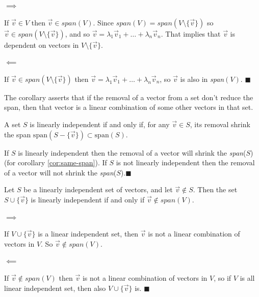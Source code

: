 \begin{tcolorbox}[colback=def_color,coltitle=black,coltext=black,colframe=pro_color_back,title=\textbf{Proof}] 

$\implies$

If $\vec v \in V$ then $\vec v \in \textit{span}(V)$. Since $\textit{span}(V) = \textit{span}(V \setminus \{\vec v\})$ so $\vec v \in \textit{span}(V \setminus \{\vec v\})$, and so $\vec v = \lambda_1 \vec v_1 + \dots + \lambda_n \vec v_n$. That implies that $\vec v$ is dependent on vectors in $V \setminus \{\vec v\}$.

$\impliedby$

If $\vec v \in \textit{span}(V \setminus \{\vec v\})$ then $\vec v = \lambda_1 \vec v_1 + \dots + \lambda_n \vec v_n$, so $\vec v$ is also in \textit{span}$(V)$.
$\blacksquare$
\end{tcolorbox}
The corollary asserts that if the removal of a vector from a set don't reduce the span, then that vector is a linear combination of some other vectors in that set.

\begin{tcolorbox}[colback=def_color,colframe=gray,coltext=black] \begin{corollary}
    A set $S$ is linearly independent if and only if, for any $\vec{v} \in S$, its removal shrink the span $\text{span}(S - \{\vec{v}\}) \subset \text{span}(S)$.
\end{corollary}
\end{tcolorbox}

\begin{tcolorbox}[colback=def_color,coltitle=black,coltext=black,colframe=pro_color_back,title=\textbf{Proof}] If $S$ is linearly independent then the removal of a vector will shrink the \textit{span}($S$) (for corollary \ref{cor:same-span}). If $S$ is not linearly independent then the removal of a vector will not shrink the \textit{span}($S$).$\blacksquare$
\end{tcolorbox}

\begin{tcolorbox}[colback=def_color,colframe=gray,coltext=black] \begin{lemma}
    Let $S$ be a linearly independent set of vectors, and let $\vec v \notin S$. Then 
    the set $S \cup \{\vec v\}$ is linearly independent if and only if $\vec v \notin \textit{span}(V)$.
\end{lemma}
\end{tcolorbox}

\begin{tcolorbox}[colback=def_color,coltitle=black,coltext=black,colframe=pro_color_back,title=\textbf{Proof}]

$\implies$

If $V \cup \{\vec v\}$ is a linear independent set, then $\vec v$ is not a linear combination of vectors in $V$. So  $\vec v \notin \textit{span}(V)$.

$\impliedby$

If $\vec v \notin \textit{span}(V)$ then $\vec v$ is not a linear combination of vectors in $V$, so if $V$ is all linear independent set, then also $V \cup \{\vec v\}$ is.
$\blacksquare$
\end{tcolorbox}

